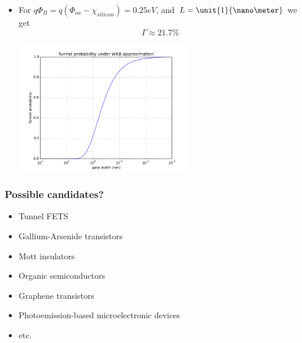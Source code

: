 \documentclass{beamer}
\begin{document}
\begin{frame}
\begin{overprint}
\begin{itemize}
\end{itemize}

\begin{itemize}
 \item For $q\Phi_B = q(\Phi_{ox} - \chi_{silicon}) = 0.25 eV$, and $L=\unit{1}{\nano\meter}$ we get
\begin{equation*}
\Gamma \approx 21.7 \%
\end{equation*}

\includegraphics[width=0.6\textwidth]{wkb}
 

\end{itemize}
\end{overprint}


\end{frame}


\begin{frame}\frametitle{Possible candidates?}
  \begin{itemize}
  \pause
   \item Tunnel FETS
   \item Gallium-Arsenide transistors
   \item Mott insulators
   \item Organic semiconductors
   \item Graphene transistors
   \item Photoemission-based microelectronic devices
   \item etc.
  \end{itemize}

\end{frame}
\end{document}
